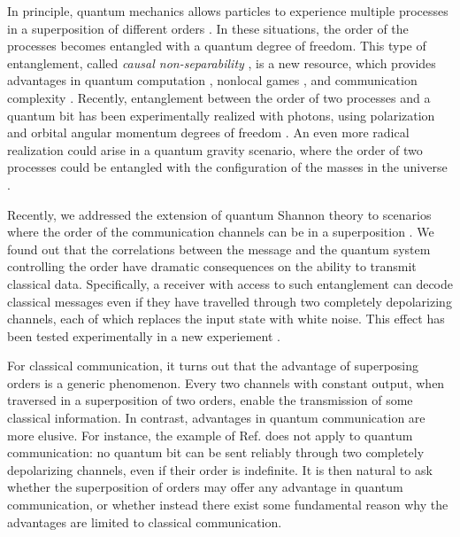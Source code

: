 \documentclass[aps,prl,twocolumn,superscriptaddress,groupedaddress]{revtex4}
\begin{document}
In principle, quantum mechanics allows  particles to  experience  multiple  processes  in a superposition of different orders  \cite{Chiribella2013}.  In these situations, the order of the processes  becomes entangled with a quantum  degree of freedom. 
 This type of entanglement, called {\em causal non-separability} \cite{oreshkov2012quantum,oreshkov2018whereabouts},  is a new resource, which provides advantages in quantum computation \cite{Chiribella2012,Araujo2014}, nonlocal games \cite{oreshkov2012quantum}, and communication complexity \cite{guerin2016exponential}.   Recently, entanglement between the order of two processes and a quantum bit has been experimentally realized with photons, using  polarization \cite{procopio2015experimental,rubino2017experimental}  and orbital angular momentum  degrees of freedom \cite{goswami2018indefinite}.    An even more radical realization could arise in a quantum gravity scenario,  where the order of two processes could be entangled with the configuration of the masses in the universe \cite{zych2017bell}. 
 

 
 Recently, we addressed the extension of quantum Shannon theory to  scenarios where the order of the communication channels can be in a superposition \cite{Ebler2017}. We found out that  the correlations  between the message and the quantum system controlling the order have dramatic consequences on the ability to transmit classical data. Specifically, a receiver with access to such entanglement can decode classical messages even if they have travelled through two completely depolarizing channels, each of which replaces the input state with white noise. This effect has been tested experimentally in a new experiement \cite{Goswami2018}.
    
For classical communication,   it turns out that the advantage of superposing orders is a generic phenomenon.  Every two  channels with constant output, when traversed in a superposition of two orders, enable the transmission of some classical information.  In contrast, advantages in quantum communication  are more elusive. For instance, the example of Ref. \cite{Ebler2017} does not apply to quantum communication:  no quantum bit can be sent reliably through two completely depolarizing channels, even if their order is  indefinite. 
   It is then  natural to ask whether the superposition of orders may offer any advantage in quantum communication, or whether instead there exist some fundamental reason why the advantages are limited to classical communication. 
   
\end{document}
